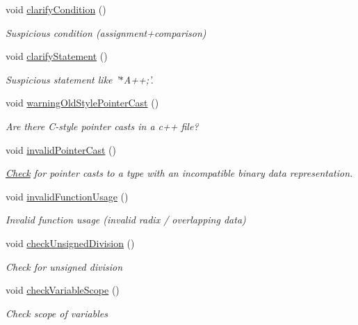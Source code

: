 \begin{DoxyCompactItemize}
void \hyperlink{class_check_other_a8a7e69ff8cb300d671f32fe37f3b1ed3}{clarify\-Condition} ()
\begin{DoxyCompactList}\small\item\em Suspicious condition (assignment+comparison) \end{DoxyCompactList}\item 
void \hyperlink{class_check_other_acdbde1dcc6f04f5b5a7d0e0675881f1d}{clarify\-Statement} ()
\begin{DoxyCompactList}\small\item\em Suspicious statement like '$\ast$\-A++;'. \end{DoxyCompactList}\item 
void \hyperlink{class_check_other_a27b6a1d09101569f2c4596560654e72f}{warning\-Old\-Style\-Pointer\-Cast} ()
\begin{DoxyCompactList}\small\item\em Are there C-\/style pointer casts in a c++ file? \end{DoxyCompactList}\item 
void \hyperlink{class_check_other_aebf615c9ae7404446033ab23e6739feb}{invalid\-Pointer\-Cast} ()
\begin{DoxyCompactList}\small\item\em \hyperlink{class_check}{Check} for pointer casts to a type with an incompatible binary data representation. \end{DoxyCompactList}\item 
void \hyperlink{class_check_other_aefaa2b1fde574dcbccb891aa1d16410a}{invalid\-Function\-Usage} ()
\begin{DoxyCompactList}\small\item\em Invalid function usage (invalid radix / overlapping data) \end{DoxyCompactList}\item 
void \hyperlink{class_check_other_ae81aa092848dcafc4cf43d8567339f8f}{check\-Unsigned\-Division} ()
\begin{DoxyCompactList}\small\item\em Check for unsigned division \end{DoxyCompactList}\item 
void \hyperlink{class_check_other_a121c1461b4f0ccb530f128f1c9cb69e3}{check\-Variable\-Scope} ()
\begin{DoxyCompactList}\small\item\em Check scope of variables \end{DoxyCompactList}\item 

\end{DoxyCompactItemize}

